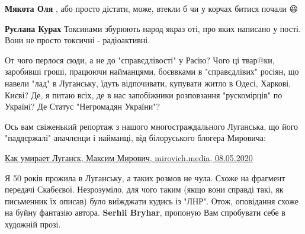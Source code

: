 \begin{itemize}
\begin{itemize}
 
\textbf{Мякота Оля} , або просто дістати, може, втекли б чи у корчах битися почали 😆

 
\textbf{Руслана Курах} Токсинами збурюють народ якраз оті, про яких написано у пості. Вони не просто токсичні - радіоактивні.
\end{itemize}

 

От чого перлося сюди, а не до "справєдлівості" у Расію? Чого ці твар@ки,
заробивші гроші, працюючи найманцями, боєввками в "справєдлівих" росіян, що
навели "лад" в Луганську, їдуть відпочивати, купувати житло в Одесі, Харкові,
Києві? Де, я питаю всіх, де в нас запобіжники розповзання "рускомірців" по
Україні? Де Статус "Негромадян України"?

Ось вам свіженький репортаж з нашого многостраждального Луганська, що його
"паддєржалі" апачлєнци і найманці, від білоруського блогера Мировича:

\href{https://mirovich.media/588697.html?fbclid=IwAR2yA6etArRgHazd-cRs9g4rcl-5yqGmL48trYDTNAACEoCK4COFlNUUGBk}{%
Как умирает Луганск, Максим Мирович, mirovich.media, 08.05.2020%
}

 

Я 50 років прожила в Луганську, а таких розмов не чула. Схоже на фрагмент
передачі Скабєєвої. Незрозуміло, для чого таким (якщо вони справді такі, як
письменник їх описав) було виїжджати кудись із "ЛНР". Отож, оповідання схоже на
буйну фантазію автора. \textbf{Serhii Bryhar}, пропоную Вам спробувати себе в художній
прозі.


\end{itemize}
